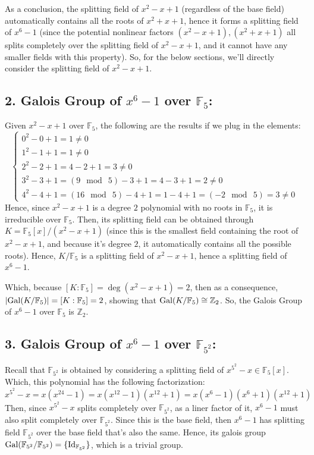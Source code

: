 \documentclass{article}
\newcommand{\FF}{\mathbb{F}}
\newcommand{\ZZ}{\mathbb{Z}}
\newcommand{\Id}{\textmd{Id}}
\newcommand{\Gal}{\textmd{Gal}}
\begin{document}
As a conclusion, the splitting field of $x^2-x+1$ (regardless of the base field) automatically contains all the roots of $x^2+x+1$, hence it forms a splitting field of $x^6-1$ (since the potential nonlinear factors $(x^2-x+1),(x^2+x+1)$ all splits completely over the splitting field of $x^2-x+1$, and it cannot have any smaller fields with this property). So, for the below sections, we'll directly consider the splitting field of $x^2-x+1$.

\subsection*{2. Galois Group of $x^6-1$ over $\FF_5$:}
Given $x^2-x+1$ over $\FF_5$, the following are the results if we plug in the elements:
\begin{equation}
    \label{eq:11}
    \begin{cases}
        0^2-0+1 = 1\neq 0\\
        1^2-1+1 = 1\neq 0\\
        2^2-2+1 = 4-2+1 = 3\neq 0\\
        3^2-3+1 = (9\mod\ 5)-3+1 = 4-3+1 = 2\neq 0\\
        4^2-4+1 = (16\mod\ 5)-4+1 = 1-4+1 = (-2\mod\ 5) = 3\neq 0
    \end{cases}
\end{equation}
Hence, since $x^2-x+1$ is a degree $2$ polynomial with no roots in $\FF_5$, it is irreducible over $\FF_5$. Then, its splitting field can be obtained through $K=\FF_5[x]/(x^2-x+1)$ (since this is the smallest field containing the root of $x^2-x+1$, and because it's degree $2$, it automatically contains all the possible roots). Hence, $K/\FF_5$ is a splitting field of $x^2-x+1$, hence a splitting field of $x^6-1$. 

Which, because $[K:\FF_5]=\deg(x^2-x+1)=2$, then as a consequence, $|\Gal(K/\FF_5)| = [K:\FF_5]=2$, showing that $\Gal(K/\FF_5)\cong \ZZ_2$. So, the Galois Group of $x^6-1$ over $\FF_5$ is $\ZZ_2$.

\subsection*{3. Galois Group of $x^6-1$ over $\FF_{5^2}$:}
Recall that $\FF_{5^2}$ is obtained by considering a splitting field of $x^{5^2}-x\in \FF_5[x]$. Which, this polynomial has the following factorization:
\begin{equation}
    x^{5^2}-x = x(x^{24}-1) = x(x^{12}-1)(x^{12}+1) = x(x^6-1)(x^6+1)(x^{12}+1)
\end{equation}
Then, since $x^{5^2}-x$ splits completely over $\FF_{5^2}$, as a liner factor of it, $x^6-1$ must also split completely over $\FF_{5^2}$. Since this is the base field, then $x^6-1$ has splitting field $\FF_{5^2}$ over the base field that's also the same. Hence, its galois group $\Gal(\FF_{5^2}/\FF_{5^2}) = \{\Id_{\FF_{5^2}}\}$, which is a trivial group.
\end{document}
